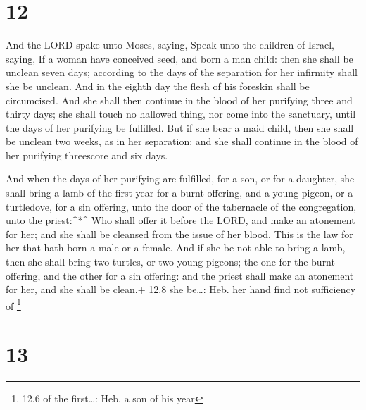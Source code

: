 \hypertarget{section-11}{%
\section{12}\label{section-11}}

 And the LORD spake unto Moses, saying,  Speak
unto the children of Israel, saying, If a woman have conceived seed, and
born a man child: then she shall be unclean seven days; according to the
days of the separation for her infirmity shall she be unclean.
 And in the eighth day the flesh of his foreskin shall be
circumcised.  And she shall then continue in the blood of
her purifying three and thirty days; she shall touch no hallowed thing,
nor come into the sanctuary, until the days of her purifying be
fulfilled.  But if she bear a maid child, then she shall be
unclean two weeks, as in her separation: and she shall continue in the
blood of her purifying threescore and six days.

 And when the days of her purifying are fulfilled, for a
son, or for a daughter, she shall bring a lamb of the first year for a
burnt offering, and a young pigeon, or a turtledove, for a sin offering,
unto the door of the tabernacle of the congregation, unto the
priest:\^{}*\^{}  Who shall offer it before the LORD, and
make an atonement for her; and she shall be cleansed from the issue of
her blood. This is the law for her that hath born a male or a female.
 And if she be not able to bring a lamb, then she shall
bring two turtles, or two young pigeons; the one for the burnt offering,
and the other for a sin offering: and the priest shall make an atonement
for her, and she shall be clean.+ 12.8 she be\ldots: Heb. her hand find
not sufficiency of \footnote{12.6 of the first\ldots: Heb. a son of his
  year}

\hypertarget{section-12}{%
\section{13}\label{section-12}}

